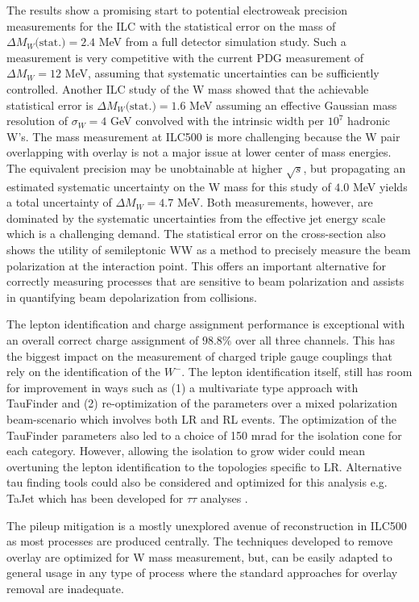 The results show a promising start to potential electroweak precision measurements for the ILC with the statistical error on the mass of $\Delta M_W\text{(stat.)}= 2.4$ MeV from a full detector simulation study. Such a measurement is very competitive with the current PDG measurement of $\Delta M_W=12$ MeV, assuming that systematic uncertainties can be sufficiently controlled.  Another ILC study of the W mass showed that the achievable statistical error is $\Delta M_W\text{(stat.)} = 1.6$ MeV assuming an effective Gaussian mass resolution of $\sigma_W= 4$ GeV convolved with the intrinsic width per $10^7$ hadronic W's\cite{graham}. The mass measurement at ILC500 is more challenging because the W pair overlapping with overlay is not a major issue at lower center of mass energies. The equivalent precision may be unobtainable at higher $\sqrt{s}$, but propagating an estimated systematic uncertainty on the W mass for this study of $4.0$ MeV yields a total uncertainty of $\Delta M_W = 4.7$ MeV. Both measurements, however, are dominated by the systematic uncertainties from the effective jet energy scale which is a challenging demand.  The statistical error on the cross-section also shows the utility of semileptonic WW as a method to precisely measure the beam polarization at the interaction point. This offers an important alternative for  correctly measuring processes that are sensitive to beam polarization and assists in quantifying beam depolarization from collisions.

The lepton identification and charge assignment performance is exceptional with an overall correct charge assignment of $98.8\%$ over all three channels. This has the biggest impact on the measurement of charged triple gauge couplings that rely on the identification of the $W^-$. The lepton identification itself, still has room for improvement in ways such as (1) a multivariate type approach with TauFinder and (2) re-optimization of the parameters over a mixed polarization beam-scenario which involves both LR and RL events.  The optimization of the TauFinder parameters also led to a choice of 150 mrad for the isolation cone for each category. However, allowing the isolation to grow wider could mean overtuning the lepton identification to the topologies specific to LR. Alternative tau finding tools could also be considered and optimized for this analysis e.g. TaJet which has been developed for $\tau\tau$ analyses \cite{tajet}.

The pileup mitigation is a mostly unexplored avenue of reconstruction in ILC500 as most processes are produced centrally. The techniques developed to remove overlay are optimized for W mass measurement, but, can be easily adapted to general usage in any type of process where the standard approaches for overlay removal are inadequate. 

